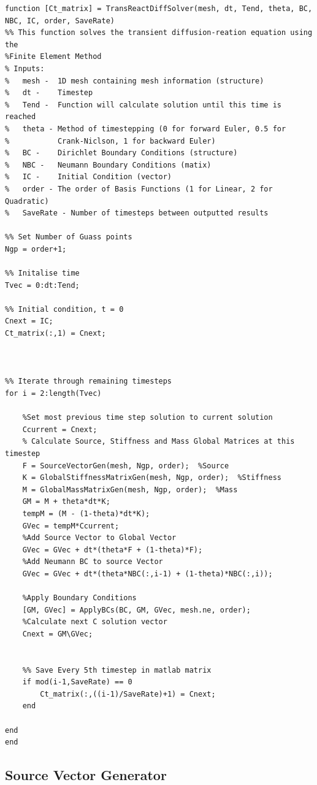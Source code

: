 \documentclass[11pt]{article}
\begin{document}
\begin{appendices}
\begin{lstlisting}
function [Ct_matrix] = TransReactDiffSolver(mesh, dt, Tend, theta, BC, NBC, IC, order, SaveRate)
%% This function solves the transient diffusion-reation equation using the
%Finite Element Method
% Inputs:
%   mesh -  1D mesh containing mesh information (structure)
%   dt -    Timestep
%   Tend -  Function will calculate solution until this time is reached
%   theta - Method of timestepping (0 for forward Euler, 0.5 for
%           Crank-Niclson, 1 for backward Euler)
%   BC -    Dirichlet Boundary Conditions (structure)
%   NBC -   Neumann Boundary Conditions (matix)
%   IC -    Initial Condition (vector)
%   order - The order of Basis Functions (1 for Linear, 2 for Quadratic)
%   SaveRate - Number of timesteps between outputted results

%% Set Number of Guass points
Ngp = order+1;

%% Initalise time
Tvec = 0:dt:Tend;

%% Initial condition, t = 0
Cnext = IC;
Ct_matrix(:,1) = Cnext;



%% Iterate through remaining timesteps
for i = 2:length(Tvec)
    
    %Set most previous time step solution to current solution
    Ccurrent = Cnext;
    % Calculate Source, Stiffness and Mass Global Matrices at this timestep
    F = SourceVectorGen(mesh, Ngp, order);  %Source
    K = GlobalStiffnessMatrixGen(mesh, Ngp, order);  %Stiffness
    M = GlobalMassMatrixGen(mesh, Ngp, order);  %Mass
    GM = M + theta*dt*K;
    tempM = (M - (1-theta)*dt*K);
    GVec = tempM*Ccurrent;
    %Add Source Vector to Global Vector
    GVec = GVec + dt*(theta*F + (1-theta)*F);
    %Add Neumann BC to source Vector
    GVec = GVec + dt*(theta*NBC(:,i-1) + (1-theta)*NBC(:,i));
    
    %Apply Boundary Conditions
    [GM, GVec] = ApplyBCs(BC, GM, GVec, mesh.ne, order);
    %Calculate next C solution vector
    Cnext = GM\GVec;
    
    
    %% Save Every 5th timestep in matlab matrix
    if mod(i-1,SaveRate) == 0
        Ct_matrix(:,((i-1)/SaveRate)+1) = Cnext;
    end
    
end
end

\end{lstlisting}
\pagebreak
\subsection{Source Vector Generator}\label{ap:SVGen}


\end{appendices}
\end{document}
